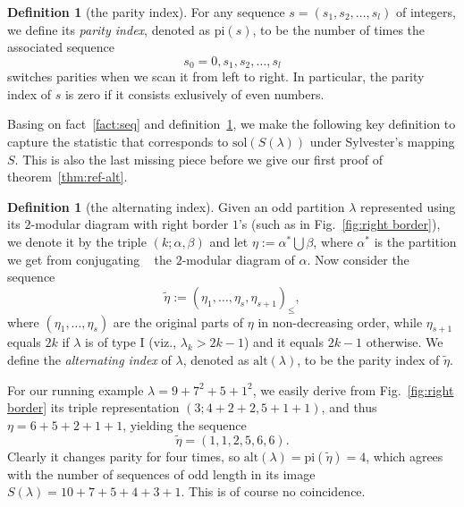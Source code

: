 \documentclass[11pt,reqno]{amsart}
\numberwithin{equation}{section}
\theoremstyle{plain}
\theoremstyle{definition}
\newtheorem{Def}[theorem]{Definition}
\theoremstyle{named}
\def\la{\lambda}
\def\sol{\mathrm{sol}}
\def\alt{\mathrm{alt}}
\def\pai{\mathrm{pi}}
\begin{document}
\begin{Def}[the parity index]\label{def:par}
For any sequence $s=(s_1,s_2,\ldots,s_l)$ of integers, we define its {\it parity index}, denoted as $\pai(s)$, to be the number of times the associated sequence $$s_0=0,s_1,s_2,\ldots,s_l$$ switches parities when we scan it from left to right. In particular, the parity index of $s$ is zero if it consists exlusively of even numbers.
\end{Def}

Basing on fact~\ref{fact:seq} and definition~\ref{def:par}, we make the following key definition to capture the statistic that corresponds to $\sol(S(\la))$ under Sylvester's mapping $S$. This is also the last missing piece before we give our first proof of theorem~\ref{thm:ref-alt}.
\begin{Def}[the alternating index]\label{def:alt}
Given an odd partition $\la$ represented using its $2$-modular diagram with right border $1$'s (such as in Fig.~\ref{fig:right border}), we denote it by the triple $(k;\alpha,\beta)$ and let $\eta:=\alpha^*\bigcup\beta$, where $\alpha^{*}$ is the partition we get from conjugating ~\cite[Defn.~1.8]{andtp} the $2$-modular diagram of $\alpha$. Now consider the sequence
$$\tilde{\eta}:=(\eta_1,\ldots,\eta_s,\eta_{s+1})_{\le},$$
where $(\eta_1,\ldots,\eta_s)$ are the original parts of $\eta$ in non-decreasing order, while $\eta_{s+1}$ equals $2k$ if $\la$ is of type I (viz., $\la_k>2k-1$) and it equals $2k-1$ otherwise.
We define the {\it alternating index} of $\la$, denoted as $\alt(\la)$, to be the parity index of $\tilde{\eta}$.
\end{Def}

For our running example $\la=9+7^2+5+1^2$, we easily derive from Fig.~\ref{fig:right border} its triple representation $(3;4+2+2,5+1+1)$, and thus $\eta=6+5+2+1+1$, yielding the sequence $$\tilde{\eta}=(1,1,2,5,6,6).$$
Clearly it changes parity for four times, so $\alt(\la)=\pai(\tilde{\eta})=4$, which agrees with the number of sequences of odd length in its image $S(\la)=10+7+5+4+3+1$. This is of course no coincidence. 
\end{document}
